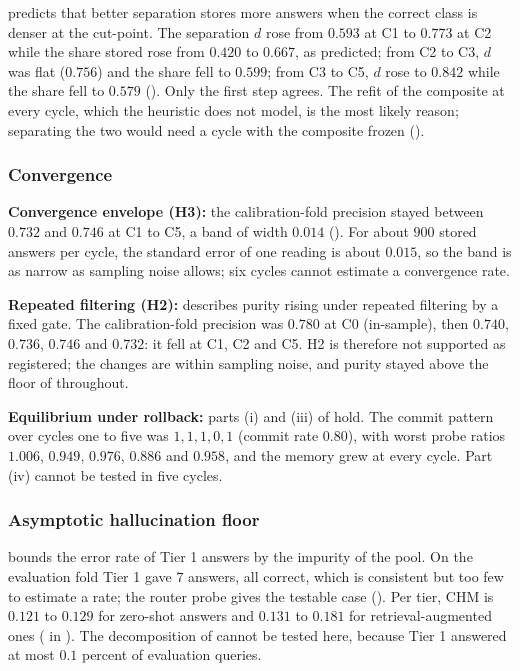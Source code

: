  predicts that better separation stores more answers when the correct class is denser at the cut-point. The separation $d$ rose from $0.593$ at C1 to $0.773$ at C2 while the share stored rose from $0.420$ to $0.667$, as predicted; from C2 to C3, $d$ was flat ($0.756$) and the share fell to $0.599$; from C3 to C5, $d$ rose to $0.842$ while the share fell to $0.579$ (). Only the first step agrees. The refit of the composite at every cycle, which the heuristic does not model, is the most likely reason; separating the two would need a cycle with the composite frozen ().

\subsubsection{Convergence}
\label{sec:check-convergence}

\textbf{Convergence envelope (H3):} the calibration-fold precision stayed between $0.732$ and $0.746$ at C1 to C5, a band of width $0.014$ (). For about $900$ stored answers per cycle, the standard error of one reading is about $0.015$, so the band is as narrow as sampling noise allows; six cycles cannot estimate a convergence rate.

\textbf{Repeated filtering (H2):}  describes purity rising under repeated filtering by a fixed gate. The calibration-fold precision was $0.780$ at C0 (in-sample), then $0.740$, $0.736$, $0.746$ and $0.732$: it fell at C1, C2 and C5. H2 is therefore not supported as registered; the changes are within sampling noise, and purity stayed above the floor of  throughout.

\textbf{Equilibrium under rollback:} parts (i) and (iii) of  hold. The commit pattern over cycles one to five was $1, 1, 1, 0, 1$ (commit rate $0.80$), with worst probe ratios $1.006$, $0.949$, $0.976$, $0.886$ and $0.958$, and the memory grew at every cycle. Part (iv) cannot be tested in five cycles.

\subsubsection{Asymptotic hallucination floor}
\label{sec:check-asymptotic}

 bounds the error rate of Tier 1 answers by the impurity of the pool. On the evaluation fold Tier 1 gave $7$ answers, all correct, which is consistent but too few to estimate a rate; the router probe gives the testable case (). Per tier, CHM is $0.121$ to $0.129$ for zero-shot answers and $0.131$ to $0.181$ for retrieval-augmented ones ( in ). The decomposition of  cannot be tested here, because Tier 1 answered at most $0.1$ percent of evaluation queries.

